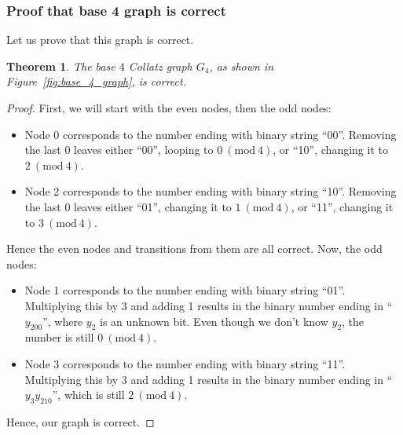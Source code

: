 \documentclass[12pt]{article}
\newcommand{\Mod}[1]{\ (\mathrm{mod}\ #1)}
\newtheorem{theorem}{Theorem}[section]
\theoremstyle{definition}
\begin{document}
\subsubsection{Proof that base 4 graph is correct} \label{subsubsec:proofbase4graph}
Let us prove that this graph is correct.
\begin{theorem}
The base $4$ Collatz graph $G_4$, as shown in Figure~\ref{fig:base_4_graph}, is correct.
\end{theorem}
\begin{proof}
First, we will start with the even nodes, then the odd nodes:
\begin{itemize}
    \item Node 0 corresponds to the number ending with binary string ``00''. Removing the last 0 leaves either ``00'', looping to $0\Mod{4}$, or ``10'', changing it to $2\Mod{4}$.
    \item Node 2 corresponds to the number ending with binary string ``10''. Removing the last 0 leaves either ``01'', changing it to $1\Mod{4}$, or ``11'', changing it to $3\Mod{4}$.
\end{itemize}
Hence the even nodes and transitions from them are all correct. Now, the odd nodes:
\begin{itemize}
    \item Node 1 corresponds to the number ending with binary string ``01''. Multiplying this by 3 and adding 1 results in the binary number ending in ``$y_200$'', where $y_2$ is an unknown bit. Even though we don't know $y_2$, the number is still $0\Mod{4}$.
    \item Node 3 corresponds to the number ending with binary string ``11''. Multiplying this by 3 and adding 1 results in the binary number ending in ``$y_3y_210$'', which is still $2\Mod{4}$.
\end{itemize}
Hence, our graph is correct.
\end{proof}
\end{document}
